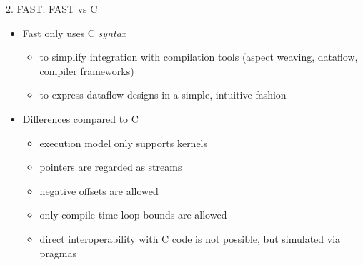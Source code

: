 \begin{frame}{2. FAST: FAST vs C}
\begin{itemize}
\item Fast only uses C \emph{syntax}
\begin{itemize}
\item to simplify integration with compilation tools (aspect weaving,
  dataflow, compiler frameworks)
  \item to express dataflow designs in a simple, intuitive fashion
\end{itemize}
\vspace{0.5cm}
\item  Differences compared to C
\begin{itemize}
\item execution model only supports kernels
\item pointers are regarded as   streams
\item negative offsets are allowed
\item only compile time loop bounds are allowed
\item direct interoperability with C code is not possible, but
  simulated via pragmas
\end{itemize}
\end{itemize}

\end{frame}
